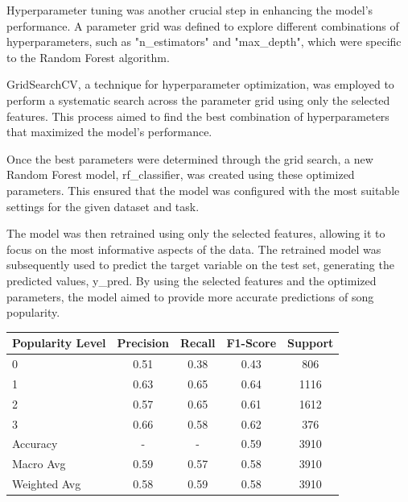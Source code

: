 \documentclass[11pt]{article} %
\begin{document}
Hyperparameter tuning was another crucial step in enhancing the model's performance. A parameter grid was defined to explore different combinations of hyperparameters, such as "n\_estimators" and "max\_depth", which were specific to the Random Forest algorithm.

GridSearchCV, a technique for hyperparameter optimization, was employed to perform a systematic search across the parameter grid using only the selected features. This process aimed to find the best combination of hyperparameters that maximized the model's performance.

Once the best parameters were determined through the grid search, a new Random Forest model, rf\_classifier, was created using these optimized parameters. This ensured that the model was configured with the most suitable settings for the given dataset and task.

The model was then retrained using only the selected features, allowing it to focus on the most informative aspects of the data. The retrained model was subsequently used to predict the target variable on the test set, generating the predicted values, y\_pred. By using the selected features and the optimized parameters, the model aimed to provide more accurate predictions of song popularity.

\begin{table}[H]
	\centering
	\begin{tabular}{lcccc}
		\toprule
		\textbf{Popularity Level} & \textbf{Precision} & \textbf{Recall} & \textbf{F1-Score} & \textbf{Support} \\
		\midrule
		\hline
		0                         & 0.51               & 0.38            & 0.43              & 806              \\
		1                         & 0.63               & 0.65            & 0.64              & 1116             \\
		2                         & 0.57               & 0.65            & 0.61              & 1612             \\
		3                         & 0.66               & 0.58            & 0.62              & 376              \\
		\hline
		Accuracy                  & -                  & -               & 0.59              & 3910             \\
		Macro Avg                 & 0.59               & 0.57            & 0.58              & 3910             \\
		Weighted Avg              & 0.58               & 0.59            & 0.58              & 3910             \\
		\bottomrule
	\end{tabular}
\end{table}
\end{document}
